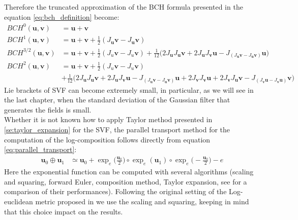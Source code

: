 Therefore the truncated approximation of the BCH formula presented in the equation \ref{eq:bch_definition} become:
\begin{align*}
BCH^{0}(\mathbf{u},\mathbf{v}) &= \mathbf{u} + \mathbf{v} \\
BCH^{1}(\mathbf{u},\mathbf{v}) &=  \mathbf{u} + \mathbf{v} + \frac{1}{2}(J_{\mathbf{u}}\mathbf{v} - J_{\mathbf{u}}\mathbf{v})\\
BCH^{3/2}(\mathbf{u},\mathbf{v}) 
&=  
\mathbf{u} + \mathbf{v} + \frac{1}{2}(J_{u}\mathbf{v} - J_{u}\mathbf{v}) + 
\frac{1}{12}\big( 
2 J_{\mathbf{u}} J_{\mathbf{u}}\mathbf{v} +2 J_{\mathbf{u}} J_{\mathbf{v}}\mathbf{u}
- 
J_{(J_{\mathbf{u}}\mathbf{v} - J_{\mathbf{u}}\mathbf{v})}\mathbf{u} 
\big) 
\\
BCH^{2}(\mathbf{u},\mathbf{v}) 
&=  
\mathbf{u} + \mathbf{v} + \frac{1}{2}(J_{u}\mathbf{v} - J_{u}\mathbf{v}) 
\\
&+ 
\frac{1}{12}\big( 
2 J_{\mathbf{u}} J_{\mathbf{u}}\mathbf{v} +2 J_{\mathbf{u}} J_{\mathbf{v}}\mathbf{u}
- 
J_{(J_{\mathbf{u}}\mathbf{v} - J_{\mathbf{u}}\mathbf{v})}\mathbf{u} 
+
2 J_{\mathbf{v}} J_{\mathbf{v}}\mathbf{u} +2 J_{\mathbf{v}} J_{\mathbf{u}}\mathbf{v}
- 
J_{(J_{\mathbf{v}}\mathbf{u} - J_{\mathbf{v}}\mathbf{u})}\mathbf{v} 
\big) 
\end{align*}
Lie brackets of SVF can become extremely small, in particular, as we will see in the last chapter, when the standard deviation of the Gaussian filter that generates the fields is small. \\
Whether it is not known how to apply Taylor method presented in \ref{se:taylor_expansion} for the SVF, the parallel transport method for the computation of the log-composition follows directly from equation  \ref{eq:parallel_transport}:
\begin{align*}
\mathbf{u}_0\oplus \mathbf{u}_1
&\simeq
\mathbf{u}_0 
+
\exp_{e}\big(\frac{\mathbf{u}_0}{2}\big)   
\circ  \exp_{e}(\mathbf{u}_1) 
\circ \exp_{e}\big(-\frac{\mathbf{u}_0}{2}\big)
-
e
\end{align*}
Here the exponential function can be computed with several algorithms (scaling and squaring, forward Euler, composition method, Taylor expansion, see \cite{bossa2008algorithms} for a comparison of their performances). Following the original setting of the Log-euclidean metric proposed in \cite{arsigny2006log} we use the scaling and squaring, keeping in mind that this choice impact on the results.








